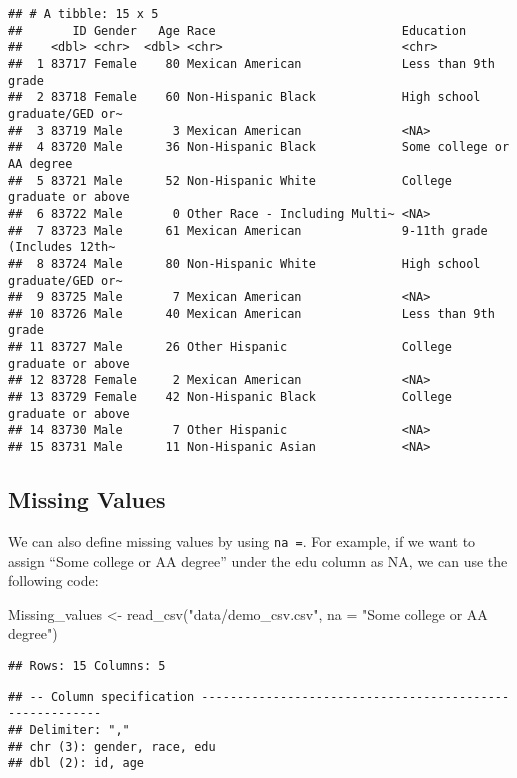 \documentclass[
]{book}
\newenvironment{Shaded}{\begin{snugshade}}{\end{snugshade}}
\newcommand{\AttributeTok}[1]{\textcolor[rgb]{0.77,0.63,0.00}{#1}}
\newcommand{\FunctionTok}[1]{\textcolor[rgb]{0.00,0.00,0.00}{#1}}
\newcommand{\NormalTok}[1]{#1}
\newcommand{\OtherTok}[1]{\textcolor[rgb]{0.56,0.35,0.01}{#1}}
\newcommand{\StringTok}[1]{\textcolor[rgb]{0.31,0.60,0.02}{#1}}
\begin{document}
\begin{verbatim}
## # A tibble: 15 x 5
##       ID Gender   Age Race                          Education
##    <dbl> <chr>  <dbl> <chr>                         <chr>
##  1 83717 Female    80 Mexican American              Less than 9th grade
##  2 83718 Female    60 Non-Hispanic Black            High school graduate/GED or~
##  3 83719 Male       3 Mexican American              <NA>
##  4 83720 Male      36 Non-Hispanic Black            Some college or AA degree
##  5 83721 Male      52 Non-Hispanic White            College graduate or above
##  6 83722 Male       0 Other Race - Including Multi~ <NA>
##  7 83723 Male      61 Mexican American              9-11th grade (Includes 12th~
##  8 83724 Male      80 Non-Hispanic White            High school graduate/GED or~
##  9 83725 Male       7 Mexican American              <NA>
## 10 83726 Male      40 Mexican American              Less than 9th grade
## 11 83727 Male      26 Other Hispanic                College graduate or above
## 12 83728 Female     2 Mexican American              <NA>
## 13 83729 Female    42 Non-Hispanic Black            College graduate or above
## 14 83730 Male       7 Other Hispanic                <NA>
## 15 83731 Male      11 Non-Hispanic Asian            <NA>
\end{verbatim}

\hypertarget{missing-values}{%
\subsection{Missing Values}\label{missing-values}}

We can also define missing values by using \texttt{na\ =}. For example, if we want to assign ``Some college or AA degree'' under the edu column as NA, we can use the following code:

\begin{Shaded}
\begin{Highlighting}[]
\NormalTok{Missing\_values }\OtherTok{\textless{}{-}} \FunctionTok{read\_csv}\NormalTok{(}\StringTok{"data/demo\_csv.csv"}\NormalTok{,}
                           \AttributeTok{na =} \StringTok{"Some college or AA degree"}\NormalTok{)}
\end{Highlighting}
\end{Shaded}

\begin{verbatim}
## Rows: 15 Columns: 5
\end{verbatim}

\begin{verbatim}
## -- Column specification --------------------------------------------------------
## Delimiter: ","
## chr (3): gender, race, edu
## dbl (2): id, age
\end{verbatim}
\end{document}

